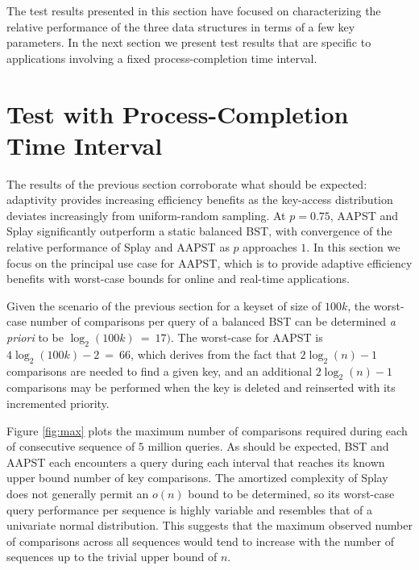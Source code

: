 \documentclass{article}
\begin{document}
The test results presented in this section have focused on characterizing the relative performance of the three data structures in terms of a few key parameters. In the next section we present test results that are specific to applications involving a fixed process-completion time interval. 

\section{Test with Process-Completion Time Interval}

The results of the previous section corroborate what should be expected: adaptivity provides increasing efficiency benefits as the key-access distribution deviates increasingly from uniform-random sampling. At $p=0.75$, AAPST and Splay significantly outperform a static balanced BST, with convergence of the relative performance of Splay and AAPST as $p$ approaches $1$. In this section we focus on the principal use case for AAPST, which is to provide adaptive efficiency benefits with worst-case bounds for online and real-time applications. 

Given the scenario of the previous section for a keyset of size of $100k$, the worst-case number of comparisons per query of a balanced BST can be determined {\em a priori} to be $\log_2(100k)~=~17)$. The worst-case for AAPST is $4\log_2(100k)-2~=~66$, which derives from the fact that $2\log_2(n)-1$ comparisons are needed to find a given key, and an additional $2\log_2(n)-1$ comparisons may be performed when the key is deleted and reinserted with its incremented priority. 

Figure \ref{fig:max} plots the maximum number of comparisons required during each of consecutive sequence of $5$ million queries. As should be expected, BST and AAPST each encounters a query during each interval that reaches its known upper bound number of key comparisons. The amortized complexity of Splay does not generally permit an $o(n)$ bound to be determined, so its worst-case query performance per sequence is highly variable and resembles that of a univariate normal distribution. This suggests that the maximum observed number of comparisons across all sequences would tend to increase with the number of sequences up to the trivial upper bound of $n$.
\end{document}
